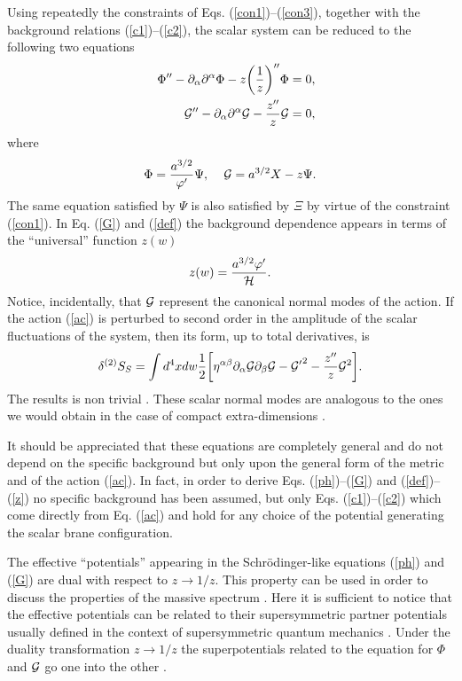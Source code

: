 \documentclass[a4paper,12pt]{article}
\begin{document}
Using repeatedly the constraints of Eqs. (\ref{con1})--(\ref{con3}), 
together with the background relations (\ref{c1})--(\ref{c2}), 
the scalar system can be reduced to the following two equations \cite{n1,n2}
\begin{eqnarray}
&& \Phi'' - \partial_{\alpha}\partial^{\alpha} \Phi - 
z\biggl(\frac{1}{z}\biggr)'' \Phi =0,
\label{ph}\\
&& {\cal G}'' - \partial_{\alpha}\partial^{\alpha}{\cal G}
- \frac{z''}{z} {\cal G} =0,
\label{G}
\end{eqnarray}
where 
\begin{equation}
\Phi= \frac{a^{3/2}}{\varphi'} \Psi,\,\,\,\,\,\,\,{\cal G} = 
a^{3/2} X - z \Psi.
\label{def}
\end{equation}
The same equation satisfied by $\Psi$ is also satisfied by $\Xi$ by virtue 
of the constraint (\ref{con1}).
In Eq. (\ref{G}) and (\ref{def}) the background dependence appears in terms 
of the ``universal'' function $z(w)$ 
\begin{equation}
z(w) = \frac{a^{3/2} \varphi'}{{\cal H}}.
\label{z}
\end{equation}
Notice, incidentally, that ${\cal G}$ represent the canonical normal modes 
of the action.
If the  action (\ref{ac}) is perturbed to second order in the 
amplitude 
of the scalar fluctuations of the system, then its form, up to total 
derivatives, is
\begin{equation}
\delta^{(2)} S_{S} = \int d^4 x d w \frac{1}{2}\biggl[ 
\eta^{\alpha\beta} 
\partial_{\alpha} {\cal G} \partial_{\beta}{\cal G} - {{\cal G}'}^2
- \frac{z''}{z} {\cal G}^2\biggr].
\label{canscal}
\end{equation}
The results \cite{n1} is non trivial \cite{n1}.
These scalar normal modes are analogous to the ones we would obtain 
in the case of compact extra-dimensions \cite{mg}.

It should be appreciated that these equations are completely general
and do not depend on the specific background but only upon the general
form of the metric and of the action (\ref{ac}). In fact, in order
to derive Eqs. (\ref{ph})--(\ref{G}) and (\ref{def})--(\ref{z}) 
no specific background has been assumed, but only Eqs. (\ref{c1})--(\ref{c2}) 
which come directly from Eq. (\ref{ac}) and hold for any choice of the 
potential generating the scalar brane configuration.

The effective ``potentials'' appearing 
in the Schr\"odinger-like equations (\ref{ph}) and (\ref{G}) are dual 
with respect to $z\rightarrow 1/z$. This property can be used in order to 
discuss the properties of the massive spectrum \cite{n1}. Here 
it is sufficient to notice that the effective potentials can be related 
to their supersymmetric partner potentials \cite{n1} usually 
defined in the context of supersymmetric quantum mechanics \cite{susqm}. 
Under the duality transformation $z \rightarrow 1/z$ 
the superpotentials related to the equation for $\Phi$ and ${\cal G}$ 
go one into the other \cite{n1}. 
\end{document}
